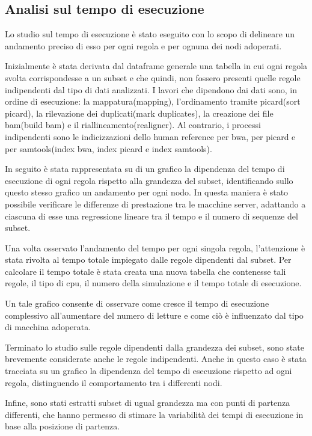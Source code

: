 \subsection{Analisi sul tempo di esecuzione}
\label{sbsec:Te}
Lo studio sul tempo di esecuzione è stato eseguito con lo scopo di delineare un andamento preciso di esso per ogni regola e per ognuna dei nodi adoperati.  

Inizialmente è stata derivata dal dataframe generale una tabella in cui ogni regola svolta corrispondesse a un subset e che quindi, non fossero presenti quelle regole indipendenti dal tipo di dati analizzati.
I lavori che dipendono dai dati sono, in ordine di esecuzione: la mappatura(mapping), l'ordinamento tramite picard(sort picard), la rilevazione dei duplicati(mark duplicates), la creazione dei file bam(build bam) e il riallineamento(realigner).
Al contrario, i processi indipendenti sono le indicizzazioni dello human reference per bwa, per picard e per samtools(index bwa, index picard e index samtools). 

In seguito è stata rappresentata su di un grafico la dipendenza del tempo di esecuzione di ogni regola rispetto alla grandezza del subset, identificando sullo questo stesso grafico un andamento per ogni nodo. 
In questa maniera è stato possibile verificare le differenze di prestazione tra le macchine server, adattando a ciascuna di esse una regressione lineare tra il tempo e il numero di sequenze del subset.

Una volta osservato l'andamento del tempo per ogni singola regola, l'attenzione è stata rivolta al tempo totale impiegato dalle regole dipendenti dal subset.
Per calcolare il tempo totale è stata creata una nuova tabella che contenesse tali regole, il tipo di cpu, il numero della simulazione e il tempo totale di esecuzione.

Un tale grafico consente di osservare come cresce il tempo di esecuzione complessivo all'aumentare del numero di letture e come ciò è influenzato dal tipo di macchina adoperata.

Terminato lo studio sulle regole dipendenti dalla grandezza dei subset, sono state brevemente considerate anche le regole indipendenti.
Anche in questo caso è stata tracciata su un grafico la dipendenza del tempo di esecuzione rispetto ad ogni regola, distinguendo il comportamento tra i differenti nodi.  

Infine, sono stati estratti subset di ugual grandezza ma con punti di partenza differenti, che hanno permesso di stimare la variabilità dei tempi di esecuzione in base alla posizione di partenza.

